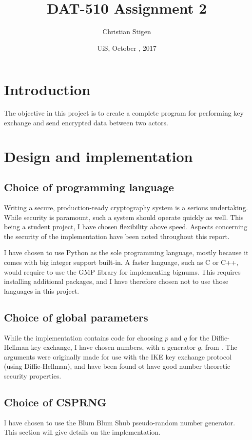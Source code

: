 \documentclass[a4paper,english,12pt]{article}
\title{DAT-510 Assignment 2}
\author{Christian Stigen}
\date{UiS, October \nth{9}, 2017}
\begin{document}
\maketitle

\begin{abstract}
\end{abstract}

\section{Introduction}
The objective in this project is to create a complete program for performing
key exchange and send encrypted data between two actors.

\section{Design and implementation}

\subsection{Choice of programming language}
Writing a secure, production-ready cryptography system is a serious
undertaking. While security is paramount, such a system should operate quickly
as well. This being a student project, I have chosen flexibility above
speed. Aspects concerning the security of the implementation have been noted
throughout this report.

I have chosen to use Python as the sole programming language, mostly because it
comes with big integer support built-in. A faster language, such as C or C++,
would require to use the GMP library \cite{wiki:gmp} for implementing bignums.
This requires installing additional packages, and I have therefore chosen not
to use those languages in this project.

\subsection{Choice of global parameters}
While the implementation contains code for choosing $p$ and $q$ for the
Diffie-Hellman key exchange, I have chosen numbers, with a generator $g$, from
\cite{rfc3526}. The arguments were originally made for use with the IKE key
exchange protocol (using Diffie-Hellman), and have been found ot have good
number theoretic security properties.

\subsection{Choice of CSPRNG}
I have chosen to use the Blum Blum Shub \cite{bbs} pseudo-random number
generator. This section will give details on the implementation.
\end{document}

